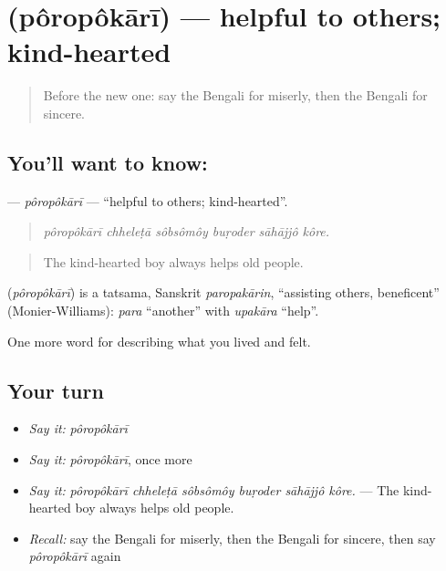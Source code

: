 \section[\texorpdfstring{\bn{পরোপকারী} (pôropôkārī)}{পরোপকারী (pôropôkārī)}]{ (pôropôkārī) — helpful to others; kind-hearted}

\label{lesson:BN-C457-poropokari}



\begin{quote}
Before the new one: say the Bengali for miserly, then the Bengali for sincere.
\end{quote}

\subsection*{You'll want to know: }
\textbf{} — \emph{pôropôkārī} — \textquotedblleft{}helpful to others; kind-hearted\textquotedblright{}.

\begin{quote}
     
\end{quote}

\begin{quote}
\emph{pôropôkārī chheleṭā sôbsômôy buṛoder sāhājjô kôre.}
\end{quote}

\begin{quote}
The kind-hearted boy always helps old people.
\end{quote}

\begin{cousinweb}
\textbf{} (\emph{pôropôkārī}) is a tatsama, Sanskrit \emph{paropakārin}, \textquotedblleft{}assisting others, beneficent\textquotedblright{} (Monier-Williams): \emph{para} \textquotedblleft{}another\textquotedblright{} with \emph{upakāra} \textquotedblleft{}help\textquotedblright{}.
\end{cousinweb}

\begin{grammarlens}[title={What you've built}]
One more word for describing what you lived and felt.
\end{grammarlens}

\subsection*{Your turn}
\begin{itemize}
\raggedright
  \item \emph{Say it:} \emph{pôropôkārī}
  \item \emph{Say it:} \emph{pôropôkārī}, once more
  \item \emph{Say it:} \emph{pôropôkārī chheleṭā sôbsômôy buṛoder sāhājjô kôre.} — The kind-hearted boy always helps old people.
  \item \emph{Recall:} say the Bengali for miserly, then the Bengali for sincere, then say \emph{pôropôkārī} again
\end{itemize}

